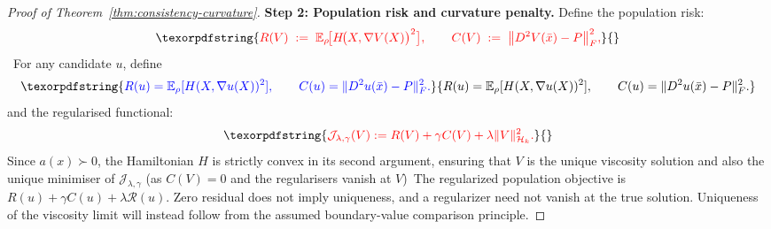 \documentclass[11pt]{article}
\theoremstyle{plain}      %
\theoremstyle{definition} %
\providecommand{\DIFaddtex}[1]{{\protect\color{blue}#1}} %
\providecommand{\DIFdeltex}[1]{{\protect\color{red}#1}} %
\providecommand{\DIFaddbegin}{} %
\providecommand{\DIFaddend}{} %
\providecommand{\DIFdelbegin}{} %
\providecommand{\DIFdelend}{} %
\providecommand{\DIFadd}[1]{\texorpdfstring{\DIFaddtex{#1}}{#1}} %
\providecommand{\DIFdel}[1]{\texorpdfstring{\DIFdeltex{#1}}{}} %
\newcommand{\DIFscaledelfig}{1.0}
\newlength{\DIFdelgraphicswidth} %
\newlength{\DIFdelgraphicsheight} %
\newcommand{\DIFaddincludegraphics}[2][]{{\color{blue}\fbox{\DIFOincludegraphics[#1]{#2}}}} %
\newcommand{\DIFdelincludegraphics}[2][]{%
\sbox{\DIFdelgraphicsbox}{\DIFOincludegraphics[#1]{#2}}%
\settoboxwidth{\DIFdelgraphicswidth}{\DIFdelgraphicsbox} %
\settoboxtotalheight{\DIFdelgraphicsheight}{\DIFdelgraphicsbox} %
\scalebox{\DIFscaledelfig}{%
\parbox[b]{\DIFdelgraphicswidth}{\usebox{\DIFdelgraphicsbox}\\[-\baselineskip] \rule{\DIFdelgraphicswidth}{0em}}\llap{\resizebox{\DIFdelgraphicswidth}{\DIFdelgraphicsheight}{%
\setlength{\unitlength}{\DIFdelgraphicswidth}%
\begin{picture}(1,1)%
\thicklines\linethickness{2pt} %
{\color[rgb]{1,0,0}\put(0,0){\framebox(1,1){}}}%
{\color[rgb]{1,0,0}\put(0,0){\line( 1,1){1}}}%
{\color[rgb]{1,0,0}\put(0,1){\line(1,-1){1}}}%
\end{picture}%
}\hspace*{3pt}}} %
} %
\DeclareRobustCommand{\DIFaddbegin}{\DIFOaddbegin \let\includegraphics\DIFaddincludegraphics} %
\DeclareRobustCommand{\DIFaddend}{\DIFOaddend \let\includegraphics\DIFOincludegraphics} %
\DeclareRobustCommand{\DIFdelbegin}{\DIFOdelbegin \let\includegraphics\DIFdelincludegraphics} %
\DeclareRobustCommand{\DIFdelend}{\DIFOaddend \let\includegraphics\DIFOincludegraphics} %
\begin{document}
\begin{proof}[Proof of Theorem~\ref{thm:consistency-curvature}]
\medskip\noindent\textbf{Step 2: Population risk and curvature \DIFdelbegin \DIFdel{penalty}\DIFdelend .}
\DIFdelbegin \DIFdel{Define the population risk:
}\[
  \DIFdel{R(V)\;:=\;\mathbb{E}_{\rho}\!\bigl[H\!\bigl(X,\nabla V(X)\bigr)^{2}\bigr],
  \qquad
  C(V)\;:=\;\bigl\|D^{2}V(\bar x)-P\bigr\|^{2}_{F},
}\]%
\DIFdelend\ \DIFaddbegin \DIFadd{For any candidate $u$, define
}\[
 \DIFadd{R(u)=\mathbb E_\rho[H(X,\nabla u(X))^2],\qquad
 C(u)=\|D^2u(\bar x)-P\|_F^2.
}\]\DIFaddend 
\DIFdelbegin \DIFdel{and the regularised functional:
}\[
  \DIFdel{\mathcal J_{\lambda,\gamma}(V) := R(V)+\gamma C(V)+\lambda\|V\|_{\mathcal H_{k}}^{2}.
}\]%
\DIFdel{Since $a(x)\succ 0$, the Hamiltonian $H$ is strictly convex in its second argument, ensuring that $V$ is the unique viscosity solution and also the unique minimiser of $\mathcal J_{\lambda,\gamma}$ (as $C(V)=0$ and the regularisers vanish at $V$)}\DIFdelend\ \DIFaddbegin \DIFadd{The regularized population objective is $R(u)+\gamma C(u)+\lambda\mathcal R(u)$. Zero residual does not imply uniqueness, and a regularizer need not vanish at the true solution. Uniqueness of the viscosity limit will instead follow from the assumed boundary-value comparison principle}\DIFaddend .


\end{proof}
\end{document}
